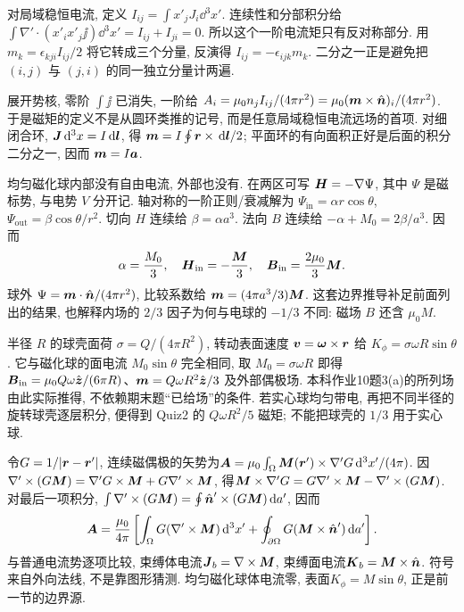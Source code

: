 对局域稳恒电流, 定义 $I_{ij}=\int x'_jJ_i\dd^3x'$. 连续性和分部积分给
$\int\nabla'\cdot(x'_ix'_j\jj)\dd^3x'=I_{ij}+I_{ji}=0$.
所以这个一阶电流矩只有反对称部分. 用 $m_k=\epsilon_{kji}I_{ij}/2$ 将它转成三个分量, 反演得 $I_{ij}=-\epsilon_{ijk}m_k$. 二分之一正是避免把 $(i,j)$ 与 $(j,i)$ 的同一独立分量计两遍.

展开势核, 零阶 $\int\jj$ 已消失, 一阶给
$A_i=\mu_0n_jI_{ij}/(4\pi r^2)=\mu_0(\boldsymbol{m}\times\hat{\boldsymbol{n}})_i/(4\pi r^2)$.
于是磁矩的定义不是从圆环类推的记号, 而是任意局域稳恒电流远场的首项. 对细闭合环, $\boldsymbol{J}\,\mathrm d^3x=I\,\mathrm d\boldsymbol{l}$, 得 $\boldsymbol{m}=I\oint\boldsymbol{r}\times\,\mathrm d\boldsymbol{l}/2$; 平面环的有向面积正好是后面的积分二分之一, 因而 $\boldsymbol{m}=I\boldsymbol{a}$.

均匀磁化球内部没有自由电流, 外部也没有. 在两区可写 $\boldsymbol{H}=-\nabla\Psi$, 其中 $\Psi$ 是磁标势, 与电势 $V$ 分开记. 轴对称的一阶正则/衰减解为 $\Psi_\mathrm{in}=\alpha r\cos\theta$, $\Psi_\mathrm{out}=\beta\cos\theta/r^2$. 切向 $H$ 连续给 $\beta=\alpha a^3$. 法向 $B$ 连续给 $-\alpha+M_0=2\beta/a^3$. 因而
\[
 \alpha=\frac{M_0}3,\quad
 \boldsymbol{H}_\mathrm{in}=-\frac{\boldsymbol{M}}3,\quad
 \boldsymbol{B}_\mathrm{in}=\frac{2\mu_0}3\boldsymbol{M}.
\]
球外 $\Psi=\boldsymbol{m}\cdot\hat{\boldsymbol{n}}/(4\pi r^2)$, 比较系数给 $\boldsymbol{m}=(4\pi a^3/3)\boldsymbol{M}$. 这套边界推导补足前面列出的结果, 也解释内场的 $2/3$ 因子为何与电球的 $-1/3$ 不同: 磁场 $B$ 还含 $\mu_0M$.

半径 $R$ 的球壳面荷 $\sigma=Q/(4\pi R^2)$, 转动表面速度 $\boldsymbol{v}=\boldsymbol{\omega}\times\boldsymbol{r}$ 给 $K_\phi=\sigma\omega R\sin\theta$. 它与磁化球的面电流 $M_0\sin\theta$ 完全相同, 取 $M_0=\sigma\omega R$ 即得
$\boldsymbol{B}_\mathrm{in}=\mu_0Q\omega\hat{\boldsymbol{z}}/(6\pi R)$、$\boldsymbol{m}=Q\omega R^2\hat{\boldsymbol{z}}/3$ 及外部偶极场. 本科作业10题3(a)的所列场由此实际推得, 不依赖期末题“已给场”的条件. 若实心球均匀带电, 再把不同半径的旋转球壳逐层积分, 便得到 Quiz2 的 $Q\omega R^2/5$ 磁矩; 不能把球壳的 $1/3$ 用于实心球.

令$G=1/|\boldsymbol{r}-\boldsymbol{r}'|$, 连续磁偶极的矢势为$\boldsymbol{A}=\mu_0\int_\Omega\boldsymbol{M}(\boldsymbol{r}')\times\nabla'G\,\mathrm d^3x'/(4\pi)$. 因$\nabla'\times(G\boldsymbol{M})=\nabla'G\times\boldsymbol{M}+G\nabla'\times\boldsymbol{M}$, 得$\boldsymbol{M}\times\nabla'G=G\nabla'\times\boldsymbol{M}-\nabla'\times(G\boldsymbol{M})$. 对最后一项积分, $\int\nabla'\times(G\boldsymbol{M})=\oint\hat{\boldsymbol{n}}'\times(G\boldsymbol{M})\,\mathrm d a'$, 因而
\[
\boldsymbol{A}=\frac{\mu_0}{4\pi}\left[\int_\Omega G(\nabla'\times\boldsymbol{M})\,\mathrm d^3x'+\oint_{\partial\Omega}G(\boldsymbol{M}\times\hat{\boldsymbol{n}}')\,\mathrm d a'\right].
\]
与普通电流势逐项比较, 束缚体电流$\boldsymbol{J}_b=\nabla\times\boldsymbol{M}$, 束缚面电流$\boldsymbol{K}_b=\boldsymbol{M}\times\hat{\boldsymbol{n}}$. 符号来自外向法线, 不是靠图形猜测. 均匀磁化球体电流零, 表面$K_\phi=M\sin\theta$, 正是前一节的边界源.
